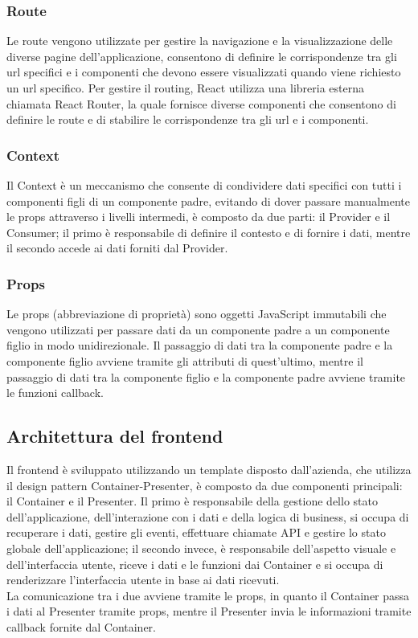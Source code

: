 \subsubsection{Route}
Le route vengono utilizzate per gestire la navigazione e la visualizzazione delle diverse pagine dell'applicazione, consentono di definire le corrispondenze tra gli url specifici e i componenti che devono essere visualizzati quando viene richiesto un url specifico.
Per gestire il routing, React utilizza una libreria esterna chiamata React Router, la quale fornisce diverse componenti che consentono di definire le route e di stabilire le corrispondenze tra gli url e i componenti.\\
\subsubsection{Context}
Il Context è un meccanismo che consente di condividere dati specifici con tutti i componenti figli di un componente padre, evitando di dover passare manualmente le props attraverso i livelli intermedi, è composto da due parti: il Provider e il Consumer; il primo è responsabile di definire il contesto e di fornire i dati, mentre il secondo accede ai dati forniti dal Provider.\\
\subsubsection{Props}
Le props (abbreviazione di proprietà) sono oggetti JavaScript immutabili che vengono utilizzati per passare dati da un componente padre a un componente figlio in modo unidirezionale.
Il passaggio di dati tra la componente padre e la componente figlio avviene tramite gli attributi di quest'ultimo, mentre il passaggio di dati tra la componente figlio e la componente padre avviene tramite le funzioni callback.\\

\subsection{Architettura del frontend}
Il frontend è sviluppato utilizzando un template disposto dall'azienda, che utilizza il design pattern Container-Presenter, è composto da due componenti principali: il Container e il Presenter.
Il primo è responsabile della gestione dello stato dell'applicazione, dell'interazione con i dati e della logica di business, si occupa di recuperare i dati, gestire gli eventi, effettuare chiamate API e gestire lo stato globale dell'applicazione; il secondo invece, è responsabile dell'aspetto visuale e dell'interfaccia utente, riceve i dati e le funzioni dai Container e si occupa di renderizzare l'interfaccia utente in base ai dati ricevuti.\\
La comunicazione tra i due avviene tramite le props, in quanto il Container passa i dati al Presenter tramite props, mentre il Presenter invia le informazioni tramite callback fornite dal Container.\\


